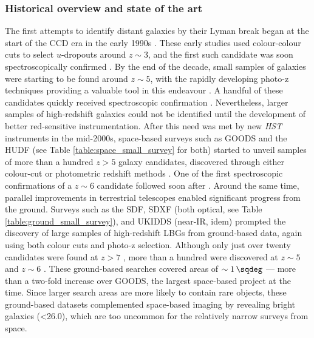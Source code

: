 \subsubsection{Historical overview and state of the art}\label{subsubsection:lyman_break_galaxy_history}
The first attempts to identify distant galaxies by their Lyman break began at the start of the CCD era in the early 1990s \citep{1990ApJ...357L...9G,1993AJ....105.2017S}. These early studies used colour-colour cuts to select $u$-dropouts around $z\sim3$, and the first such candidate was soon spectroscopically confirmed \citep{1994A&A...288..103G}. By the end of the decade, small samples of galaxies were starting to be found around $z\sim5$, with the rapidly developing photo-z techniques providing a valuable tool in this endeavour \citep{1996Natur.381..759L,1999ApJ...513...34F}. A handful of these candidates quickly received spectroscopic confirmation \citep{1998AJ....116.2617S,1998ApJ...505L..95W}.  Nevertheless, larger samples of high-redshift galaxies could not be identified until the development of better red-sensitive instrumentation. After this need was met by new \textit{HST} instruments in the mid-2000s, space-based surveys such as GOODS and the HUDF (see Table \ref{table:space_small_survey} for both) started to unveil samples of more than a hundred $z>5$ galaxy candidates, discovered through either colour-cut or photometric redshift methods \citep{2003MNRAS.342..439S,2004ApJ...600L.103G,2006A&A...449..951G,2006ApJ...653...53B}. One of the first spectroscopic confirmations of a $z\sim6$ candidate followed soon after \citep{2004ApJ...600L..99D}. Around the same time, parallel improvements in terrestrial telescopes enabled significant progress from the ground. Surveys such as the SDF, SDXF (both optical, see Table \ref{table:ground_small_survey}), and UKIDDS (near-IR, idem) prompted the discovery of large samples of high-redshift LBGs from ground-based data, again using both colour cuts and photo-z selection. Although only just over twenty candidates were found at $z>7$ \citep{2009ApJ...706.1136O}, more than a hundred were discovered at $z\sim5$ and $z\sim6$ \citep{2004ApJ...613L...9N,2004ApJ...611..660O,2006MNRAS.372..357M,2006ApJ...653..988Y}. These ground-based searches covered areas of $\sim \SI{1}{\sqdeg}$ --- more than a two-fold increase over GOODS, the largest space-based project at the time. Since larger search areas are more likely to contain rare objects, these ground-based datasets complemented space-based imaging by revealing bright galaxies (<\SI{26.0}{\magab}), which are too uncommon for the relatively narrow surveys from space. \par


